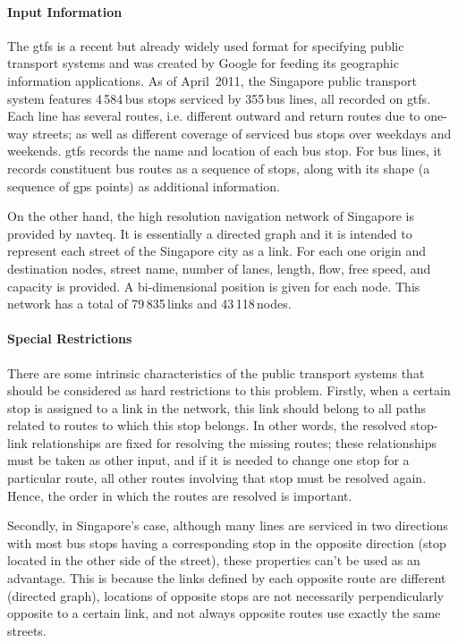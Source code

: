 \paragraph{Input Information}

The \gls{gtfs} is a recent but already widely used format for specifying public transport systems and was created by Google for feeding its geographic information applications. As of April~2011, the Singapore public transport system features 4\,584\,bus stops serviced by 355\,bus lines, all recorded on \gls{gtfs}. Each line has several routes, i.e. different outward and return routes due to one-way streets; as well as different coverage of serviced bus stops over weekdays and weekends. \gls{gtfs} records the name and location of each bus stop. For bus lines, it records constituent bus routes as a sequence of stops, along with its shape (a sequence of \gls{gps} points) as additional information. 

On the other hand, the high resolution navigation network of Singapore is provided by \gls{navteq}. It is essentially a directed graph and it is intended to represent each street of the Singapore city as a link. For each one origin and destination nodes, street name, number of lanes, length, flow, free speed, and capacity is provided. A bi-dimensional position is given for each node. This network has a total of 79\,835\,links and 43\,118\,nodes.

\paragraph{Special Restrictions}

There are some intrinsic characteristics of the public transport systems that should be considered as hard restrictions to this problem. Firstly, when a certain stop is assigned to a link in the network, this link should belong to all paths related to routes to which this stop belongs. In other words, the resolved stop-link relationships are fixed for resolving the missing routes; these relationships must be taken as other input, and if it is needed to change one stop for a particular route, all other routes involving that stop must be resolved again. Hence, the order in which the routes are resolved is important.

Secondly, in Singapore's case, although many lines are serviced in two directions with most bus stops having a corresponding stop in the opposite direction (stop located in the other side of the street), these properties can't be used as an advantage. This is because the links defined by each opposite route are different (directed graph), locations of opposite stops are not necessarily perpendicularly opposite to a certain link, and not always opposite routes use exactly the same streets.

